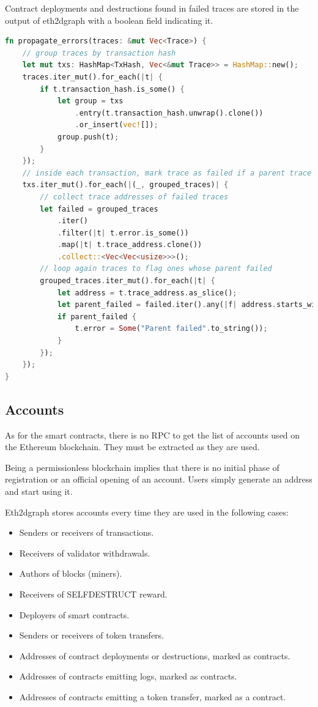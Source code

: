 Contract deployments and destructions found in failed traces are stored in the output of eth2dgraph with a boolean field indicating it.

\begin{lstlisting}[language=Rust,caption={Algorithm for errors propagation in traces.},label={lst:error-propagation},captionpos=b, style=boxed]
fn propagate_errors(traces: &mut Vec<Trace>) {
    // group traces by transaction hash
    let mut txs: HashMap<TxHash, Vec<&mut Trace>> = HashMap::new();
    traces.iter_mut().for_each(|t| {
        if t.transaction_hash.is_some() {
            let group = txs
                .entry(t.transaction_hash.unwrap().clone())
                .or_insert(vec![]);
            group.push(t);
        }
    });
    // inside each transaction, mark trace as failed if a parent trace has failed
    txs.iter_mut().for_each(|(_, grouped_traces)| {
        // collect trace addresses of failed traces
        let failed = grouped_traces
            .iter()
            .filter(|t| t.error.is_some())
            .map(|t| t.trace_address.clone())
            .collect::<Vec<Vec<usize>>>();
        // loop again traces to flag ones whose parent failed
        grouped_traces.iter_mut().for_each(|t| {
            let address = t.trace_address.as_slice();
            let parent_failed = failed.iter().any(|f| address.starts_with(f));
            if parent_failed {
                t.error = Some("Parent failed".to_string());
            }
        });
    });
}
\end{lstlisting}

\subsection{Accounts}

As for the smart contracts, there is no RPC to get the list of accounts used on the Ethereum blockchain. They must be extracted as they are used.

Being a permissionless blockchain implies that there is no initial phase of registration or an official opening of an account. Users simply generate an address and start using it. 

Eth2dgraph stores accounts every time they are used in the following cases:

\begin{itemize}
    \item Senders or receivers of transactions.
    \item Receivers of validator withdrawals.
    \item Authors of blocks (miners).
    \item Receivers of SELFDESTRUCT reward.
    \item Deployers of smart contracts.
    \item Senders or receivers of token transfers.
    \item Addresses of contract deployments or destructions, marked as contracts.
    \item Addresses of contracts emitting logs, marked as contracts.
    \item Addresses of contracts emitting a token transfer, marked as a contract.
\end{itemize}


